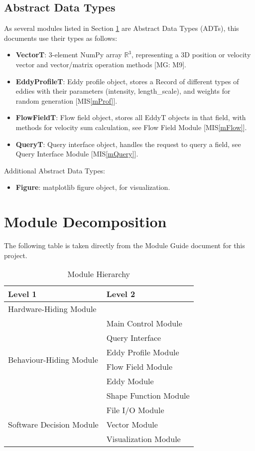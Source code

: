 \documentclass[12pt, titlepage]{article}
\begin{document}
\subsection{Abstract Data Types}

As several modules listed in Section \ref{SecMD} are Abstract Data Types (ADTs), this documents use their types as follows:
\begin{itemize}
  \item \textbf{VectorT}: 3-element NumPy array $\mathbb{R}^3$, representing a 3D position or velocity vector and vector/matrix operation methods [MG: M9].
  \item \textbf{EddyProfileT}: Eddy profile object, stores a Record of different types of eddies with their parameters (intensity, length\_scale), and weights for random generation [MIS\ref{mProf}].
  \item \textbf{FlowFieldT}: Flow field object, stores all EddyT objects in that field, with methods for velocity sum calculation, see Flow Field Module [MIS\ref{mFlow}].
  \item \textbf{QueryT}: Query interface object, handles the request to query a field, see Query Interface Module [MIS\ref{mQuery}].
\end{itemize}

Additional Abstract Data Types:
\begin{itemize}
  \item \textbf{Figure}: matplotlib figure object, for visualization.
\end{itemize}

\section{Module Decomposition} \label{SecMD}

The following table is taken directly from the Module Guide document for this project.
\begin{table}[h!]
  \centering
  \begin{tabular}{p{} p{}}
  \toprule
  \textbf{Level 1} & \textbf{Level 2}\\
  \midrule
  
  {Hardware-Hiding Module} & ~ \\
  \midrule
  
  \multirow{6}{0.3\textwidth}{Behaviour-Hiding Module}
  & Main Control Module\\
  & Query Interface\\
  & Eddy Profile Module\\
  & Flow Field Module\\
  & Eddy Module\\
  & Shape Function Module\\
  \midrule
  
  \multirow{3}{0.3\textwidth}{Software Decision Module} 
  & File I/O Module\\
  & Vector Module\\
  & Visualization Module\\
  \bottomrule

\end{tabular}
\caption{Module Hierarchy}
\label{TblMH}
\end{table}
\end{document}
